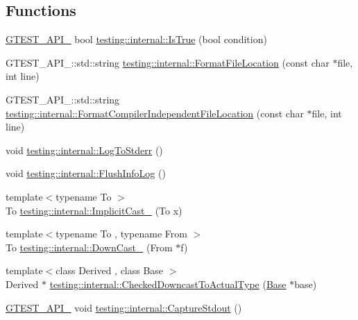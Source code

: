 \subsection*{Functions}
\begin{DoxyCompactItemize}
\item 
\hyperlink{gtest-port_8h_aa73be6f0ba4a7456180a94904ce17790}{G\+T\+E\+S\+T\+\_\+\+A\+P\+I\+\_\+} bool \hyperlink{namespacetesting_1_1internal_a527b9bcc13669b9a16400c8514266254}{testing\+::internal\+::\+Is\+True} (bool condition)
\item 
G\+T\+E\+S\+T\+\_\+\+A\+P\+I\+\_\+\+::std\+::string \hyperlink{namespacetesting_1_1internal_a31b7c3abed4a7c395f42c61e993989f4}{testing\+::internal\+::\+Format\+File\+Location} (const char $\ast$file, int line)
\item 
G\+T\+E\+S\+T\+\_\+\+A\+P\+I\+\_\+\+::std\+::string \hyperlink{namespacetesting_1_1internal_a1ee4cde97868c53e442d3182496a9f3c}{testing\+::internal\+::\+Format\+Compiler\+Independent\+File\+Location} (const char $\ast$file, int line)
\item 
void \hyperlink{namespacetesting_1_1internal_a06b1b20029fbd1dbeb59752f914fab84}{testing\+::internal\+::\+Log\+To\+Stderr} ()
\item 
void \hyperlink{namespacetesting_1_1internal_a2135f223bf6b527729aeaa651115183b}{testing\+::internal\+::\+Flush\+Info\+Log} ()
\item 
{\footnotesize template$<$typename To $>$ }\\To \hyperlink{namespacetesting_1_1internal_a982df3f369643b175f79cda4048bc3b9}{testing\+::internal\+::\+Implicit\+Cast\+\_\+} (To x)
\item 
{\footnotesize template$<$typename To , typename From $>$ }\\To \hyperlink{namespacetesting_1_1internal_a1a1a1aed3fe00908b8a45d5ab4a33665}{testing\+::internal\+::\+Down\+Cast\+\_\+} (From $\ast$f)
\item 
{\footnotesize template$<$class Derived , class Base $>$ }\\Derived $\ast$ \hyperlink{namespacetesting_1_1internal_abfe9bfb020d38aa4e0e12c001911b22b}{testing\+::internal\+::\+Checked\+Downcast\+To\+Actual\+Type} (\hyperlink{class_base}{Base} $\ast$base)
\item 
\hyperlink{gtest-port_8h_aa73be6f0ba4a7456180a94904ce17790}{G\+T\+E\+S\+T\+\_\+\+A\+P\+I\+\_\+} void \hyperlink{namespacetesting_1_1internal_acba06d4f0343dec407738ba5544af990}{testing\+::internal\+::\+Capture\+Stdout} ()
\item 

\end{DoxyCompactItemize}
